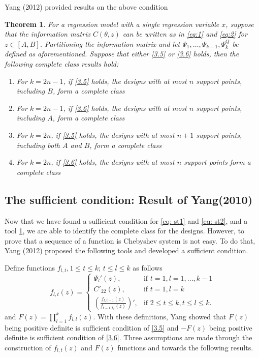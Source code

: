 \documentclass[11pt]{amsart}
\newtheorem{theorem}{Theorem}[section]
\theoremstyle{definition}
\theoremstyle{remark}
\begin{document}
Yang (2012) provided results on the above condition
\begin{theorem}\label{2012a}
For a regression model with a single regression variable $x$, suppose that the information matrix $C(\theta,z)$ can be written as in \eqref{eq:1} and \eqref{eq:2} for $z\in[A,B]$. Partitioning the information matrix and let $\Psi_1,\ldots,\Psi_{k-1},\Psi^Q_{k}$ be defined as aforementioned. Suppose that either \ref{3.5} or \ref{3.6} holds, then the following complete class results hold:
\begin{enumerate}
    \item [(a)] For $k=2n-1$, if \ref{3.5} holds, the designs with at most $n$ support points, including $B$, form a complete class
    
      \item [(b)] For $k=2n-1$, if \ref{3.6} holds, the designs with at most $n$ support points, including $A$, form a complete class
      \item [(c)] For $k=2n$, if \ref{3.5} holds, the designs with at most $n+1$ support points, including both $A$ and $B$, form a complete class
      \item [(d)] For $k=2n$, if \ref{3.6} holds, the designs with at most $n$ support points form a complete class
    
\end{enumerate}
\end{theorem}

\subsection{The sufficient condition: Result of Yang(2010)}

Now that we have found a sufficient condition for \eqref{eq: st1} and  \eqref{eq: st2}, and a tool \ref{2012a}, we are able to identify the complete class for the designs. However, to prove that a sequence of a function is Chebyshev system is not easy. To do that, Yang (2012) proposed the following tools and developed a sufficient condition.

 Define functions $f_{l,t}, 1\le t \le k$; $t\le l \le k$ as follows
\begin{equation}\label{eq: ff}
f_{l,t}(z) = \left \{ \begin{array}{ll}
\Psi_l'(z), & \text{if } t=1,l=1,...,k-1\\
C'_{22}(z), & \text{if } t=1,l=k\\
(\frac{f_{l,t-1}(z)}{f_{t-1,t_1}(z)})', & \text{if } 2\le t\le k, t\le l \le k.
\end{array}\right.
\end{equation}
and   $F(z) = \prod_{l=1}^k f_{l,l}(z)$. With these definitions, Yang showed that $F(z)$ being positive definite is sufficient condition of \ref{3.5} and  $-F(z)$ being positive definite is sufficient condition of \ref{3.6}. Three assumptions are made through the construction of $f_{l,t}(z)$ and $F(z)$ functions and towards the following results. 
\end{document}
